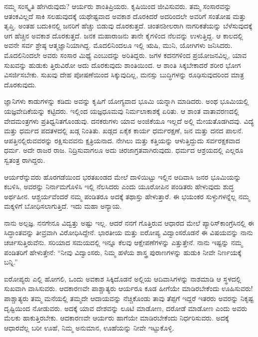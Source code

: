 ನಮ್ಮ ಸಂಸ್ಕೃತಿ ಹೇಗಿರುವುದು? ಆರ್ಯರು ಶಾಂತಿಪ್ರಿಯರು. ಕೃಷಿಯಿಂದ ಜೀವಿಸುವರು. ತಮ್ಮ ಸಂಸಾರವನ್ನು ಆತಂಕವಿಲ್ಲದೆ ಸಾಕಿ ಸಲಹುವುದಕ್ಕೆ ಯಥೇಷ್ಟವಾದ ಅವಕಾಶ ದೊರಕಿದರೆ ಅದರಿಂದಲೇ ಅವರಿಗೆ ಸಂತೋಷ ಮತ್ತು ತೃಪ್ತಿ. ಅಂತಹ ಬದುಕಿನಲ್ಲಿ ಜನರಿಗೆ ಹೆಚ್ಚು ಬಿಡುವು ದೊರಕುತ್ತದೆ. ಚಿಂತನಶೀಲರಾಗಿ ನಾಗರಿಕತೆಯನ್ನು ಬೆಳೆಸುವುದಕ್ಕೆ ಆಗ ಹೆಚ್ಚಿನ ಅವಕಾಶ ದೊರಕುತ್ತದೆ. ಜನಕ ಮಹಾರಾಜನು ತಾನೇ ಕೈಗಳಿಂದ ನೆಲವನ್ನು ಉಳುತ್ತಿದ್ದ. ಆ ಕಾಲದಲ್ಲಿ ಅವನೇ ಸರ್ವ ಶ್ರೇಷ್ಠ ಆತ್ಮಜ್ಞಾನಿಯಾಗಿದ್ದ. ಮೊದಲಿನಿಂದಲೂ ಇಲ್ಲಿ ಋಷಿ, ಮುನಿ, ಯೋಗಿಗಳು ಜನಿಸಿದರು. ಮೊದಲಿನಿಂದಲೇ ಅವರು ಸಂಸಾರ ಮಿಥ್ಯೆ ಎಂಬುದನ್ನು ಅರಿತಿದ್ದರು. ಜಗಳ ಕದನಗಳಿಂದ ಪ್ರಯೋಜನವಿಲ್ಲ, ಯಾವ ಸುಖವನ್ನು ಹುಡುಕು ತ್ತಿರುವಿರೋ ಅದು ದೊರಕುವುದು ಶಾಂತಿಯಿಂದ. ಆ ಶಾಂತಿ ಸಿಕ್ಕಬೇಕಾದರೆ ಶರೀರ ಭೋಗ ವಿಸರ್ಜಿಸಬೇಕು. ಸುಖವು ದೇಹ ಪೋಷಣೆಯಿಂದ ಸಿಕ್ಕುವುದಿಲ್ಲ, ಮನಸ್ಸು ಬುದ್ಧಿಗಳನ್ನು ರೂಢಿಸುವುದರಿಂದ ಮಾತ್ರ ದೊರಕುವುದು.

ಜ್ಞಾನಿಗಳು ಕಾಡುಗಳನ್ನು ಕಡಿದು ಅವನ್ನು ಕೃಷಿಗೆ ಯೋಗ್ಯವಾದ ಭೂಮಿ ಯನ್ನಾಗಿ ಮಾಡಿದರು. ಅಂಥ ಭೂಮಿಯಲ್ಲಿ ಯಜ್ಞವೇದಿಕೆಯನ್ನು ಕಟ್ಟಿದರು. ಇಲ್ಲಿಂದ ಯಜ್ಞಧೂಮವು ನಿರ್ಮಲಾಕಾಶಕ್ಕೆ ಏರಿತು. ಆ ಶಾಂತ ವಾತಾವರಣದಲ್ಲಿ ವೇದಮಂತ್ರಗಳು ಪ್ರತಿಧ್ವನಿತಗೊಂಡುವು. ದನಕರುಗಳು ಯಾವ ಅಂಜಿಕೆಯೂ ಇಲ್ಲದೆ ಅಲ್ಲಿ ಮೇಯತೊಡಗಿದವು. ವಿದ್ಯೆ ಮತ್ತು ಧರ್ಮದ ಪದತಳದಲ್ಲಿ ಖಡ್ಗ ನಿಂತಿತು. ಖಡ್ಗದ ಏಕೈಕ ಕಾರ್ಯ ಧರ್ಮರಕ್ಷಣೆ, ಜನ ಮತ್ತು ದನದ ಪಾಲನೆ. ಆಪತ್ತಿನಲ್ಲಿರುವವರನ್ನು ರಕ್ಷಿಸುವವನು ಕ್ಷತ್ರಿಯನಾದ. ನೇಗಿಲು ಮತ್ತು ಕತ್ತಿಯನ್ನು ಆಳುತ್ತಿದ್ದುದು ಸರ್ವರಕ್ಷಕವಾದ ಧರ್ಮ. ಅದೇ ರಾಜರ ರಾಜ. ನಿದ್ರಿಸುವಾಗಲೂ ಅದು ಚಿರಜಾಗ್ರತವಾಗಿರುವುದು. ಧರ್ಮದ ಆಶ್ರಯದಲ್ಲಿ ಎಲ್ಲರೂ ಸ್ವತಂತ್ರ ರಾಗಿದ್ದರು.

ಆರ್ಯರೆನ್ನುವರು ಹೊರಗಡೆಯಿಂದ ಭರತಖಂಡದ ಮೇಲೆ ದಾಳಿಯಿಟ್ಟು ಇಲ್ಲಿನ ಆದಿವಾಸಿ ಜನರ ಭೂಮಿಯನ್ನು ಕಬಳಿಸಿ, ಅವರನ್ನು ನಿರ್ನಾಮಗೊಳಿಸಿ ಇಲ್ಲಿ ನೆಲಸಿದರು ಎಂದು ಯೂರೋಪಿನ ಪಂಡಿತರು ಹೇಳುವುದು ಶುದ್ಧ ಅರ್ಥಹೀನ. ಆಶ್ಚರ್ಯವೆಂದರೆ ನಮ್ಮ ಪಂಡಿತರೂ ಅದಕ್ಕೆ ತಥಾಸ್ತು ಹೇಳುತ್ತಾರೆ. ಈ ಭಯಂಕರ ಸುಳ್ಳುಗಳನ್ನೆಲ್ಲ ನಮ್ಮ ಮಕ್ಕಳಿಗೆ ಬೋಧಿಸಲಾಗುತ್ತಿದೆ. ಇದು ಮಹಾ ಅನ್ಯಾಯ.

ನಾನು ಅಲ್ಪಜ್ಞ. ನನಗೇನೂ ವಿದ್ವತ್ತು ಅಷ್ಟು ಇಲ್ಲ. ಆದರೆ ನನಗೆ ಗೊತ್ತಿರುವ ಆಧಾರದ ಮೇಲೆ ಪ್ಯಾರಿಸ್​ ಕಾಂಗ್ರೆಸಿನಲ್ಲಿ ಈ ಸಿದ್ಧಾಂತವನ್ನು ತೀವ್ರವಾಗಿ ವಿರೋಧಿಸಿದ್ದೇನೆ. ಭಾರತೀಯ ಮತ್ತು ಐರೋಪ್ಯ ವಿದ್ವಾಂಸರೊಡನೆ ಈ ವಿಷಯವನ್ನು ನಾನು ಚರ್ಚಿಸುತ್ತಿರುವೆನು. ಸರಿಯಾದ ಸಮಯದಲ್ಲಿ ಇನ್ನೂ ಕೆಲವು ಆಕ್ಷೇಪಣೆಗಳನ್ನು ಎತ್ತುತ್ತೇನೆ. ನಾನು ಇಷ್ಟನ್ನು ನಮ್ಮ ಪಂಡಿತರಿಗೆ ಹೇಳುತ್ತೇನೆ: “ನೀವು ವಿದ್ವಾಂಸರು, ನಿಮ್ಮ ಹಳೆಯ ಶಾಸ್ತ್ರ ಪುರಾಣಗಳನ್ನು ಹುಡುಕಿ ನೀವೇ ನಿರ್ಣಯಕ್ಕೆ ಬನ್ನಿ.”

ಐರೋಪ್ಯರು ಎಲ್ಲಿ ಹೋಗಲಿ, ಒಂದು ಅವಕಾಶ ಸಿಕ್ಕಿದೊಡನೆ ಅಲ್ಲಿಯ ಆದಿವಾಸಿಗಳನ್ನು ನಾಶಮಾಡಿ ಆ ಸ್ಥಳದಲ್ಲಿ ಸುಖವಾಗಿ ವಾಸಿಸುವರು. ಆದಕಾರಣವೇ ಪಾಶ್ಚಾತ್ಯರು ಆರ್ಯರೂ ಕೂಡ ಹೀಗೆಯೇ ಮಾಡಿರಬೇಕೆಂದು ಊಹಿಸುವರು! ಪಾಶ್ಚಾತ್ಯರು ತಮ್ಮ ಮನೆಯಲ್ಲಿ ತಮ್ಮದೇ ಆದಾಯವನ್ನು ನೆಚ್ಚಿಕೊಂಡು ತಾವು ತೆಪ್ಪಗೆ ಇದ್ದರೆ ಇತರರು ಅವರನ್ನು ನಿಕೃಷ್ಟ ದೃಷ್ಟಿಯಿಂದ ನೋಡುವರು. ಅದಕ್ಕೆ ಯಾವ ದೇಶವನ್ನು ಲೂಟಿ ಮಾಡೋಣ, ದರೋಡೆ ಮಾಡೋಣ ಎಂದು ಅವರು ಮೆಲಕು ಹಾಕುತ್ತಿರಬೇಕು. ಆದಕಾರಣವೇ ಆರ್ಯರು ಹಾಗೆಯೇ ಮಾಡಿರಬೇಕೆಂದು ನಿರ್ಧರಿಸುವರು. ಅದಕ್ಕೆ ಆಧಾರವೆಲ್ಲ ಬರೀ ಊಹೆ, ನಿಮ್ಮ ಅನುಮಾನ, ಊಹೆಯನ್ನು ನೀವೇ ಇಟ್ಟುಕೊಳ್ಳಿ.

